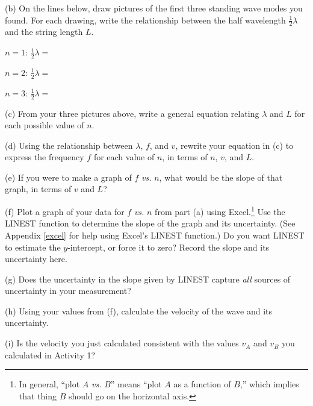 \pagebreak[3]

(b) On the lines below, draw pictures of the first three standing wave modes you found.  For each drawing, write the relationship between the half wavelength $\frac{1}{2}\lambda$ and the string length $L$.

\begin{center}
$n=1$: 
\raisebox{-0.15in}{\rule{3pt}{0.4in}}\raisebox{.05in}{\rule{2.5in}{0.1pt}}\raisebox{-0.15in}{\rule{3pt}{0.4in}}
\hspace{0.3in}$\frac{1}{2}\lambda=$

$n=2$:
\raisebox{-0.15in}{\rule{3pt}{0.4in}}\raisebox{.05in}{\rule{2.5in}{0.1pt}}\raisebox{-0.15in}{\rule{3pt}{0.4in}}
\hspace{0.3in}$\frac{1}{2}\lambda=$

$n=3$:
\raisebox{-0.15in}{\rule{3pt}{0.4in}}\raisebox{.05in}{\rule{2.5in}{0.1pt}}\raisebox{-0.15in}{\rule{3pt}{0.4in}}
\hspace{0.3in}$\frac{1}{2}\lambda=$
\end{center}

(c) From your three pictures above, write a general equation relating $\lambda$ and $L$ for each possible value of $n$.
\answerspace{2cm}

(d) Using the relationship between $\lambda$, $f$, and $v$, rewrite your equation in (c) to express the frequency $f$ for each value of $n$, in terms of $n$, $v$, and $L$.
\answerspace{2cm}

(e) If you were to make a graph of $f$ \textit{vs.} $n$, what would be the slope of that graph, in terms of $v$ and $L$?
\answerspace{2cm}

\pagebreak[3]
(f) Plot a graph of your data for $f$ \textit{vs.} $n$ from part (a) using Excel.\footnote{In general, ``plot $A$ \textit{vs.} $B$'' means ``plot $A$ as a function of $B$,'' which implies that thing $B$ should go on the horizontal axis.} Use the LINEST function to determine the slope of the graph and its uncertainty. (See Appendix \ref{excel} for help using Excel's LINEST function.)  Do you want LINEST to estimate the $y$-intercept, or force it to zero?  Record the slope and its uncertainty here.
\answerspace{3cm}



(g) Does the uncertainty in the slope given by LINEST capture \textit{all} sources of uncertainty in your measurement?
\answerspace{2cm}

(h) Using your values from (f), calculate the velocity of the wave and its uncertainty. 
\answerspace{4cm}

(i) Is the velocity you just calculated consistent with the values $v_A$ and $v_B$ you calculated in Activity 1?  
\answerspace{3cm}


%




